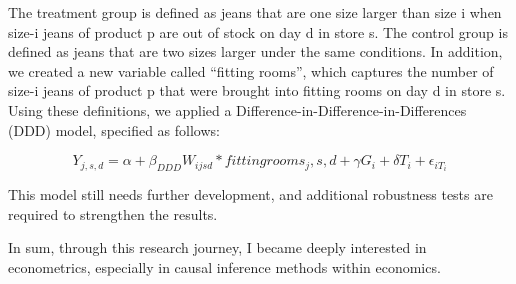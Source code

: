 \documentclass[letterpaper,12pt]{article}
\theoremstyle{definition}
\begin{document}
 The treatment group is defined as jeans that are one size larger than size i when size-i jeans of product p are out of stock on day d in store s. The control group is defined as jeans that are two sizes larger under the same conditions. In addition, we created a new variable called “fitting rooms”, which captures the number of size-i jeans of product p that were brought into fitting rooms on day d in store s. Using these definitions, we applied a Difference-in-Difference-in-Differences (DDD) model, specified as follows: 

\begin{equation*}
	Y_{j,s,d} = \alpha + \beta_{DDD} W_{ijsd}*fittingrooms_j,s,d + \gamma G_i + \delta T_i + \epsilon_{iT_i}
\end{equation*}

This model still needs further development, and additional robustness tests are required to strengthen the results.

In sum, through this research journey, I became deeply interested in econometrics, especially in causal inference methods within economics.





	
\end{document}
